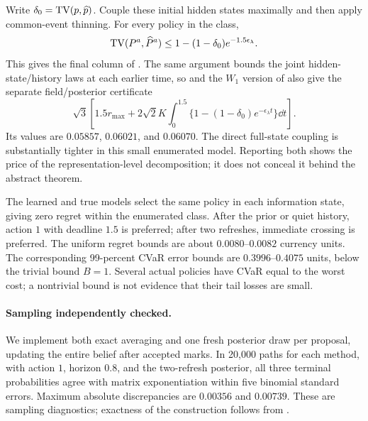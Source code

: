 \begin{table}[htbp]
\centering\small

\caption{Exact finite-state policy evaluation. The maximum value error is over all 32 policies at the stated history. The final column is a uniform full-path certificate for the entire deadline class; it is not measured path TV.}\label{tab:complete-model}
\end{table}

Write $\delta_0=\operatorname{TV}(p,\widehat p)$. Couple these initial hidden states maximally and then apply common-event thinning. For every policy in the class,
\begin{equation}\label{eq:complete-path}
 \operatorname{TV}(P^a,\widehat P^a)\le
 1-(1-\delta_0)e^{-1.5\epsilon_\lambda}.
\end{equation}
This gives the final column of . The same argument bounds the joint hidden-state/history laws at each earlier time, so  and the $W_1$ version of  also give the separate field/posterior certificate
\begin{equation}\label{eq:complete-field}
 \sqrt3\left[1.5r_{\max}
 +2\sqrt2K\int_0^{1.5}\{1-(1-\delta_0)e^{-\epsilon_\lambda t}\}\dd t\right].
\end{equation}
Its values are $0.05857$, $0.06021$, and $0.06070$. The direct full-state coupling is substantially tighter in this small enumerated model. Reporting both shows the price of the representation-level decomposition; it does not conceal it behind the abstract theorem.

The learned and true models select the same policy in each information state, giving zero regret within the enumerated class. After the prior or quiet history, action $1$ with deadline $1.5$ is preferred; after two refreshes, immediate crossing is preferred. The uniform regret bounds are about $0.0080$--$0.0082$ currency units. The corresponding 99-percent CVaR error bounds are $0.3996$--$0.4075$ units, below the trivial bound $B=1$. Several actual policies have CVaR equal to the worst cost; a nontrivial bound is not evidence that their tail losses are small.

\paragraph{Sampling independently checked.}
We implement both exact averaging and one fresh posterior draw per proposal, updating the entire belief after accepted marks. In 20,000 paths for each method, with action $1$, horizon $0.8$, and the two-refresh posterior, all three terminal probabilities agree with matrix exponentiation within five binomial standard errors. Maximum absolute discrepancies are $0.00356$ and $0.00739$. These are sampling diagnostics; exactness of the construction follows from .

